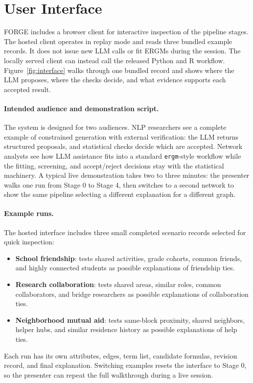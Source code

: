 \documentclass[11pt]{article}
\begin{document}
\section{User Interface}
\label{sec:interface}

FORGE includes a browser client for interactive inspection of the pipeline stages. The hosted client operates in replay mode and reads three bundled example records. It does not issue new LLM calls or fit ERGMs during the session. The locally served client can instead call the released Python and R workflow. Figure~\ref{fig:interface} walks through one bundled record and shows where the LLM proposes, where the checks decide, and what evidence supports each accepted result.

\paragraph{Intended audience and demonstration script.}
The system is designed for two audiences. NLP researchers see a complete example of constrained generation with external verification: the LLM returns structured proposals, and statistical checks decide which are accepted. Network analysts see how LLM assistance fits into a standard \texttt{ergm}-style workflow while the fitting, screening, and accept/reject decisions stay with the statistical machinery. A typical live demonstration takes two to three minutes: the presenter walks one run from Stage 0 to Stage 4, then switches to a second network to show the same pipeline selecting a different explanation for a different graph.

\paragraph{Example runs.}
The hosted interface includes three small completed scenario records selected for quick inspection:
\begin{itemize}
    \item \textbf{School friendship}: tests shared activities, grade cohorts, common friends, and highly connected students as possible explanations of friendship ties.
    \item \textbf{Research collaboration}: tests shared areas, similar roles, common collaborators, and bridge researchers as possible explanations of collaboration ties.
    \item \textbf{Neighborhood mutual aid}: tests same-block proximity, shared neighbors, helper hubs, and similar residence history as possible explanations of help ties.
\end{itemize}
Each run has its own attributes, edges, term list, candidate formulas, revision record, and final explanation. Switching examples resets the interface to Stage 0, so the presenter can repeat the full walkthrough during a live session.
\end{document}

